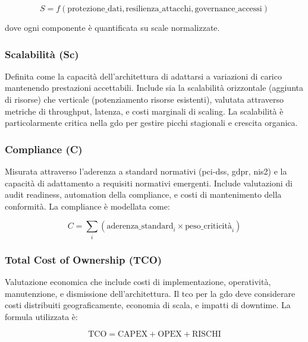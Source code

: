 \begin{equation}
S = f(\text{protezione\_dati}, \text{resilienza\_attacchi}, \text{governance\_accessi})
\label{eq:sicurezza}
\end{equation}

dove ogni componente è quantificata su scale normalizzate.

\subsubsection{Scalabilità (Sc)}

Definita come la capacità dell'architettura di adattarsi a variazioni di carico mantenendo prestazioni accettabili. Include sia la scalabilità orizzontale (aggiunta di risorse) che verticale (potenziamento risorse esistenti), valutata attraverso metriche di throughput, latenza, e costi marginali di scaling. La scalabilità è particolarmente critica nella \gls{gdo} per gestire picchi stagionali e crescita organica.

\subsubsection{Compliance (C)}

Misurata attraverso l'aderenza a standard normativi (\gls{pci-dss}, \gls{gdpr}, \gls{nis2}) e la capacità di adattamento a requisiti normativi emergenti. Include valutazioni di audit readiness, automation della compliance, e costi di mantenimento della conformità. La compliance è modellata come:

\begin{equation}
C = \sum_{i} (\text{aderenza\_standard}_i \times \text{peso\_criticità}_i)
\label{eq:compliance}
\end{equation}

\subsubsection{Total Cost of Ownership (TCO)}

Valutazione economica che include costi di implementazione, operatività, manutenzione, e dismissione dell'architettura. Il \gls{tco} per la \gls{gdo} deve considerare costi distribuiti geograficamente, economia di scala, e impatti di downtime. La formula utilizzata è:

\begin{equation}
\text{TCO} = \text{CAPEX} + \text{OPEX} + \text{RISCHI}
\label{eq:tco}
\end{equation}

